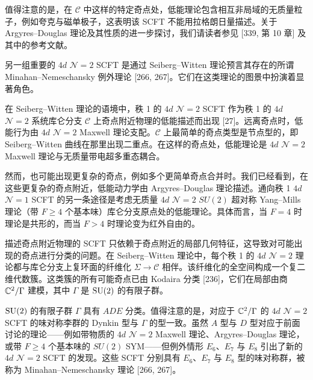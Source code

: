 值得注意的是，在 $\mathcal{C}$ 中这样的特定奇点处，低能理论包含相互非局域的无质量粒子，例如夸克与磁单极子，这表明该 SCFT 不能用拉格朗日量描述。关于 Argyres–Douglas 理论及其性质的进一步探讨，我们请读者参见 [339, 第 10 章] 及其中的参考文献。

另一组重要的 $4d$ $\mathcal{N}=2$ SCFT 是通过 Seiberg–Witten 理论预言其存在的所谓 Minahan–Nemeschansky 例外理论 [266, 267]。它们在这类理论的图景中扮演着显著角色。

在 Seiberg–Witten 理论的语境中，秩 1 的 $4d$ $\mathcal{N}=2$ SCFT 作为秩 1 的 $4d$ $\mathcal{N}=2$ 系统库仑分支 $\mathcal{C}$ 上奇点附近物理的低能描述而出现 [27]。远离奇点时，低能行为由 $4d$ $\mathcal{N}=2$ Maxwell 理论支配。$\mathcal{C}$ 上最简单的奇点类型是节点型的，即 Seiberg–Witten 曲线在那里出现二重点。在这样的奇点处，低能理论是 $4d$ $\mathcal{N}=2$ Maxwell 理论与无质量带电超多重态耦合。

然而，也可能出现更复杂的奇点，例如多个更简单奇点合并时。我们已经看到，在这些更复杂的奇点附近，低能动力学由 Argyres–Douglas 理论描述。通向秩 1 $4d$ $\mathcal{N}=1$ SCFT 的另一条途径是考虑无质量 $4d$ $\mathcal{N}=2$ $SU(2)$ 超对称 Yang–Mills 理论（带 $F\ge4$ 个基本味）库仑分支原点处的低能理论。具体而言，当 $F=4$ 时理论是共形的，而当 $F>4$ 时理论变为红外自由的。

描述奇点附近物理的 SCFT 只依赖于奇点附近的局部几何特征，这导致对可能出现的奇点进行分类的问题。在 Seiberg–Witten 理论中，每个秩 1 的 $4d$ $\mathcal{N}=2$ 理论都与库仑分支上复环面的纤维化 $\Sigma\to\mathcal{C}$ 相伴。该纤维化的全空间构成一个复二维代数簇。这类簇的所有可能奇点已由 Kodaira 分类 [236]，它们在局部由商 $\mathbb{C}^2/\Gamma$ 建模，其中 $\Gamma$ 是 $\operatorname{SU}(2)$ 的有限子群。

$\operatorname{SU}(2)$ 的有限子群 $\Gamma$ 具有 $ADE$ 分类。值得注意的是，对应于 $\mathbb{C}^2/\Gamma$ 的 $4d$ $\mathcal{N}=2$ SCFT 的味对称李群的 Dynkin 型与 $\Gamma$ 的型一致。虽然 $A$ 型与 $D$ 型对应于前面讨论的理论——例如带物质的 $4d$ $\mathcal{N}=2$ Maxwell 理论、Argyres–Douglas 理论，或带 $F\ge4$ 个基本味的 $SU(2)$ SYM——但例外情形 $E_6$、$E_7$ 与 $E_8$ 引出了新的 $4d$ $\mathcal{N}=2$ SCFT 的发现。这些 SCFT 分别具有 $E_6$、$E_7$ 与 $E_8$ 型的味对称群，被称为 Minahan–Nemeschansky 理论 [266, 267]。

